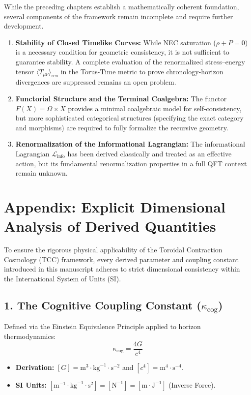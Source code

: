 \documentclass[12pt,openany]{book}
\theoremstyle{plain}
\theoremstyle{definition}
\theoremstyle{remark}
\begin{document}
While the preceding chapters establish a mathematically coherent foundation, several components of the framework remain incomplete and require further development.

\begin{enumerate}
    \item \textbf{Stability of Closed Timelike Curves:} While NEC saturation ($\rho + P = 0$) is a necessary condition for geometric consistency, it is not sufficient to guarantee stability. A complete evaluation of the renormalized stress--energy tensor $\langle T_{\mu\nu} \rangle_{\text{ren}}$ in the Torus-Time metric to prove chronology-horizon divergences are suppressed remains an open problem.
    \item \textbf{Functorial Structure and the Terminal Coalgebra:} The functor $F(X) = \Omega \times X$ provides a minimal coalgebraic model for self-consistency, but more sophisticated categorical structures (specifying the exact category and morphisms) are required to fully formalize the recursive geometry.
    \item \textbf{Renormalization of the Informational Lagrangian:} The informational Lagrangian $\mathcal{L}_{\text{info}}$ has been derived classically and treated as an effective action, but its fundamental renormalization properties in a full QFT context remain unknown.
\end{enumerate}

\chapter{Appendix: Explicit Dimensional Analysis of Derived Quantities}

To ensure the rigorous physical applicability of the Toroidal Contraction Cosmology (TCC) framework, every derived parameter and coupling constant introduced in this manuscript adheres to strict dimensional consistency within the International System of Units (SI). 

\section*{1. The Cognitive Coupling Constant ($\kappa_{\text{cog}}$)}
Defined via the Einstein Equivalence Principle applied to horizon thermodynamics:
\[ \kappa_{\text{cog}} = \frac{4G}{c^4} \]
\begin{itemize}
    \item \textbf{Derivation:} $[G] = \text{m}^3 \cdot \text{kg}^{-1} \cdot \text{s}^{-2}$ and $[c^4] = \text{m}^4 \cdot \text{s}^{-4}$.
    \item \textbf{SI Units:} $[\text{m}^{-1} \cdot \text{kg}^{-1} \cdot \text{s}^2] = [\text{N}^{-1}] = [\text{m} \cdot \text{J}^{-1}]$ (Inverse Force).
\end{itemize}
\end{document}
